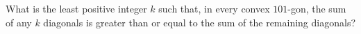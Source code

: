 What is the least positive integer $k$ such that, in every convex $101$-gon, the sum of any $k$ diagonals is greater than or equal to the sum of the remaining diagonals?
